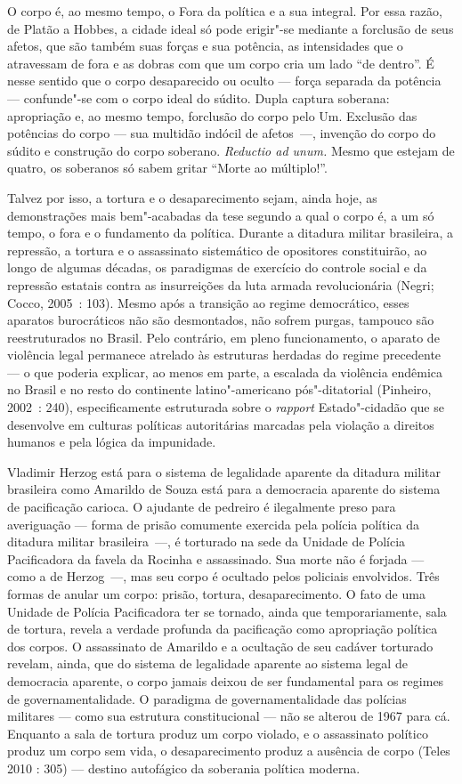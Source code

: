 O corpo é, ao mesmo tempo, o Fora da política e a sua integral. Por essa
razão, de Platão a Hobbes, a cidade ideal só pode erigir"-se mediante a
forclusão de seus afetos, que são também suas forças e sua potência, as
intensidades que o atravessam de fora e as dobras com que um corpo cria
um lado ``de dentro''. É nesse sentido que o corpo desaparecido ou
oculto --- força separada da potência --- confunde"-se com o corpo ideal do
súdito. Dupla captura soberana: apropriação e, ao mesmo tempo, forclusão
do corpo pelo Um. Exclusão das potências do corpo --- sua multidão
indócil de \mbox{afetos~---,} invenção do corpo do súdito e construção do corpo
soberano. \emph{Reductio ad unum. }Mesmo que estejam de quatro, os
soberanos só sabem gritar ``Morte ao múltiplo!''.

Talvez por isso, a tortura e o desaparecimento sejam, ainda hoje, as
demonstrações mais bem"-acabadas da tese segundo a qual o corpo é, a um
só tempo, o fora e o fundamento da política. Durante a ditadura militar
brasileira, a repressão, a tortura e o assassinato sistemático de
opositores constituirão, ao longo de algumas décadas, os paradigmas de
exercício do controle social e da repressão estatais contra as
insurreições da luta armada revolucionária (Negri; Cocco, 2005~: 103).
Mesmo após a transição ao regime democrático, esses aparatos
burocráticos não são desmontados, não sofrem purgas, tampouco são
reestruturados no Brasil. Pelo contrário, em pleno funcionamento, o
aparato de violência legal permanece atrelado às estruturas herdadas do
regime precedente --- o que poderia explicar, ao menos em parte, a
escalada da violência endêmica no Brasil e no resto do continente
latino"-americano pós"-ditatorial (Pinheiro, 2002~: 240), especificamente
estruturada sobre o \emph{rapport }Estado"-cidadão que se desenvolve em
culturas políticas autoritárias marcadas pela violação a direitos
humanos e pela lógica da impunidade.

Vladimir Herzog está para o sistema de legalidade aparente da ditadura
militar brasileira como Amarildo de Souza está para a democracia
aparente do sistema de pacificação carioca. O ajudante de pedreiro é
ilegalmente preso para averiguação --- forma de prisão comumente exercida
pela polícia política da ditadura militar brasileira~---, é torturado na
sede da Unidade de Polícia Pacificadora da favela da Rocinha e
assassinado. Sua morte não é forjada --- como a de Herzog~---, mas seu
corpo é ocultado pelos policiais envolvidos. Três formas de anular um
corpo: prisão, tortura, desaparecimento. O fato de uma Unidade de
Polícia Pacificadora ter se tornado, ainda que temporariamente, sala de
tortura, revela a verdade profunda da pacificação como apropriação
política dos corpos. O assassinato de Amarildo e a ocultação de seu
cadáver torturado revelam, ainda, que do sistema de legalidade aparente
ao sistema legal de democracia aparente, o corpo jamais deixou de ser
fundamental para os regimes de governamentalidade. O paradigma de
governamentalidade das polícias militares --- como sua estrutura
constitucional --- não se alterou de 1967 para cá. Enquanto a sala de
tortura produz um corpo violado, e o assassinato político produz um
corpo sem vida, o desaparecimento produz a ausência de corpo (Teles 2010
: 305) --- destino autofágico da soberania política moderna.

